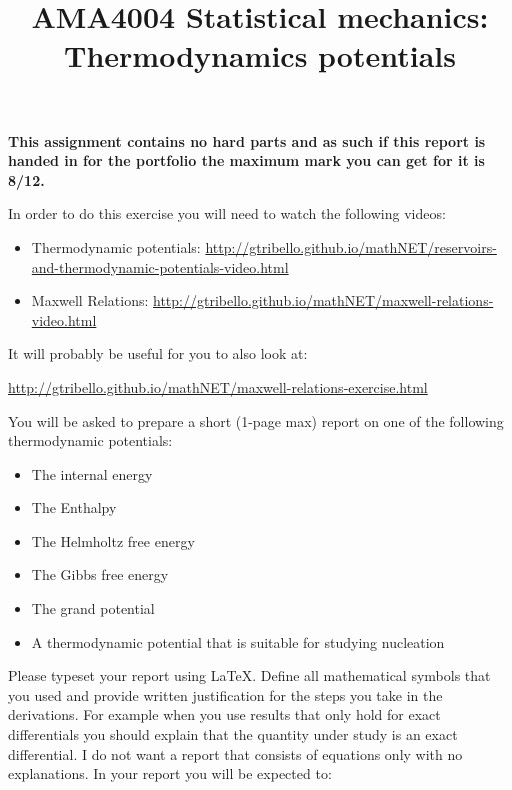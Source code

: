 \documentclass[a4paper]{article}
\title{
\vspace{-3em}
\begin{tcolorbox}
\Huge\sffamily AMA4004 Statistical mechanics: Thermodynamics potentials   
\end{tcolorbox}
\vspace{-3em}
}
\date{}
\begin{document}
\maketitle

{\bf This assignment contains no hard parts and as such if this report is handed in for the portfolio the maximum mark you can get for it is 8/12.} 

In order to do this exercise you will need to watch the following videos:

\begin{itemize}
\item Thermodynamic potentials: \href{http://gtribello.github.io/mathNET/reservoirs-and-thermodynamic-potentials-video.html}{http://gtribello.github.io/mathNET/reservoirs-and-thermodynamic-potentials-video.html}
\item Maxwell Relations: \href{http://gtribello.github.io/mathNET/maxwell-relations-video.html}{http://gtribello.github.io/mathNET/maxwell-relations-video.html}
\end{itemize}

It will probably be useful for you to also look at:

\href{http://gtribello.github.io/mathNET/maxwell-relations-exercise.html}{http://gtribello.github.io/mathNET/maxwell-relations-exercise.html}

You will be asked to prepare a short (1-page max) report on one of the following thermodynamic potentials:

\begin{itemize}
\item The internal energy
\item The Enthalpy
\item The Helmholtz free energy
\item The Gibbs free energy
\item The grand potential
\item A thermodynamic potential that is suitable for studying nucleation
\end{itemize}

Please typeset your report using \LaTeX. Define all mathematical symbols that you used and provide written justification for the steps you take in the derivations.  For example when you use results that only hold for exact differentials you should explain that the quantity under study is an exact differential.  I do not want a report that consists of equations only with no explanations.  In your report you will be expected to:
\end{document}
